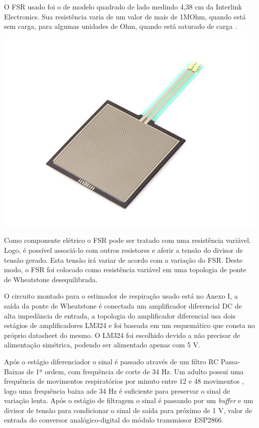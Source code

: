	O FSR usado foi o de modelo quadrado de lado medindo 4,38 cm da Interlink Electronics. Sua resistência varia de um valor de mais de 1MOhm, quando está sem carga, para algumas unidades de Ohm, quando está saturado de carga \cite{fsr_guide}.
    
    \begin{center}
    	\includegraphics[scale=0.4]{figuras/fsr_model.jpg}
        \label{fsr_model}
    \end{center}

	Como componente elétrico o FSR pode ser tratado com uma resistência variável. Logo, é possível associá-lo com outros resistores e aferir a tensão do divisor de tensão gerado. Esta tensão irá variar de acordo com a variação do FSR. Deste modo, o FSR foi colocado como resistência variável em uma topologia de ponte de Wheatstone desequilibrada.
    
	O circuito montado para o estimador de respiração usado está no Anexo I, a saída da ponte de Wheatstone é conectada um amplificador diferencial DC de alta impedância de entrada, a topologia do amplificador diferencial usa dois estágios de amplificadores LM324 e foi baseada em um esquemático que consta no próprio datasheet do mesmo. O LM324 foi escolhido devido a não precisar de alimentação simétrica, podendo ser alimentado apenas com 5 V. 
    
	Após o estágio diferenciador o sinal é passado através de um filtro RC Passa-Baixas de 1ª ordem, com frequência de corte de 34 Hz. Um adulto possuí uma frequência de movimentos respiratórios por minuto entre 12 e 48 movimentos \cite{siate}, logo uma frequência baixa ade 34 Hz é suficiente para preservar o sinal de variação lenta. Após o estágio de filtragem o sinal é passando por um \textit{buffer} e um divisor de tensão para condicionar o sinal de saída para próximo de 1 V, valor de entrada do conversor analógico-digital do módulo transmissor ESP2866.
    
